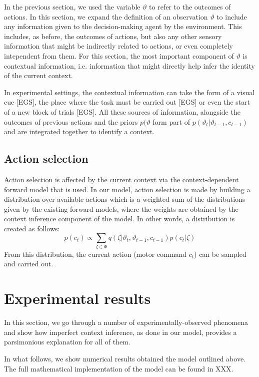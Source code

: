 \documentclass[a4paper,doc,floatsintext,natbib]{apa6}
\begin{document}
In the previous section, we used the variable $\vartheta$ to refer to the outcomes of actions. In this section, we expand the definition of an observation $\vartheta$ to include any information given to the decision-making agent by the environment. This includes, as before, the outcomes of actions, but also any other sensory information that might be indirectly related to actions, or even completely intependent from them. For this section, the most important component of $\vartheta$ is contextual information, i.e. information that might directly help infer the identity of the current context.

In experimental settings, the contextual information can take the form of a visual cue [EGS], the place where the task must be carried out [EGS] or even the start of a new block of trials [EGS]. All these sources of information, alongside the outcomes of previous actions and the priors $p(\vartheta$ form part of $p(\vartheta_t | \vartheta_{t-1
}, c_{t-1})$ and are integrated together to identify a context.

\subsection{Action selection}
Action selection is affected by the current context via the context-dependent forward model that is used. In our model, action selection is made by building a distribution over available actions which is a weighted sum of the distributions given by the existing forward models, where the weights are obtained by the context inference component of the model. In other words, a distribution is created as follows:
\begin{equation}
p(c_t) \propto \displaystyle\sum_{\zeta \in \Phi}q(\zeta | \vartheta_t, \vartheta_{t-1}, c_{t-1}) p(c_t | \zeta)
\end{equation}
From this distribution, the current action (motor command $c_t$) can be sampled and carried out.

\section{Experimental results}
In this section, we go through a number of experimentally-observed phenomena and show how imperfect context inference, as done in our model, provides a parsimonious explanation for all of them.

In what follows, we show numerical results obtained the model outlined above. The full mathematical implementation of the model can be found in XXX.
\end{document}
